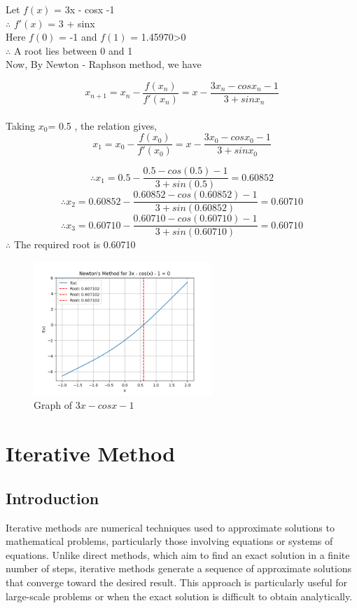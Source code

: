 \documentclass[12pt,a4paper]{article}
\begin{document}
	
	Let \(f(x)\) = 3x - cosx -1 \\
	$\therefore$ \(f'(x)\) = 3 + sinx \\
	Here \(f(0)\) = -1 and \(f(1)\) = 1.45970>0 \\
	$\therefore$ A root lies between 0 and 1 \\
	Now, By Newton - Raphson method, we have 
	
	
	\[
	x_{n+1} = x_n - \frac{f(x_n)}{f'(x_n)} = x - \frac{3x_n - cosx_n - 1}{3 + sin x_n}
	\]
	\\
	Taking $x_{0}$= 0.5 , the relation gives, \\
	\[
	x_{1} = x_0 - \frac{f(x_0)}{f'(x_0)} = x - \frac{3x_0 - cosx_0 - 1}{3 + sin x_0}
	\]
	
	\[
	\therefore x_{1} = 0.5 - \frac{0.5 - cos(0.5) - 1}{3 + sin (0.5)} = 0.60852
	\]
	\[
	\therefore x_{2} = 0.60852 - \frac{0.60852 - cos(0.60852) - 1}{3 + sin (0.60852)} = 0.60710
	\]
	\[
	\therefore x_{3} = 0.60710 - \frac{0.60710 - cos(0.60710) - 1}{3 + sin (0.60710)} = 0.60710
	\]
	$\therefore$ The required root is 0.60710
	
	\begin{figure}[h]
		\centering
		\includegraphics[width=0.6\textwidth]{Nr_fig_2.png} %
		\caption{Graph of $3x - cosx -1$}
		\label{x}
	\end{figure}
	
	
	\newpage
	\section{\centering Iterative Method}
	
	\subsection{Introduction} \fontsize{18pt}{18pt}\selectfont
	Iterative methods are numerical techniques used to approximate solutions to mathematical problems, particularly those involving equations or systems of equations. Unlike direct methods, which aim to find an exact solution in a finite number of steps, iterative methods generate a sequence of approximate solutions that converge toward the desired result. This approach is particularly useful for large-scale problems or when the exact solution is difficult to obtain analytically.\\
	
\end{document}
